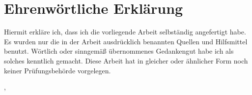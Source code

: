 
\section*{Ehrenwörtliche Erklärung}

Hiermit erkläre ich, dass ich die vorliegende Arbeit selbständig angefertigt habe.
Es wurden nur die in der Arbeit ausdrücklich benannten Quellen und Hilfsmittel benutzt.
Wörtlich oder sinngemäß übernommenes Gedankengut habe ich als solches kenntlich gemacht.
Diese Arbeit hat in gleicher oder ähnlicher Form noch keiner Prüfungsbehörde vorgelegen.
\vspace{20mm}

\ort, \abgabedatum
\vspace{10mm}

\underline{\hspace{8cm}}\\\dokumentenautor